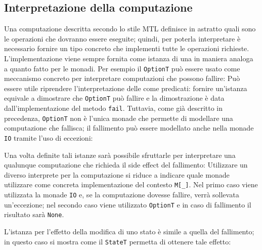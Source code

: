 \subsection{Interpretazione della computazione}
Una computazione descritta secondo lo stile \ac{MTL} definisce in astratto quali sono le operazioni che dovranno essere eseguite; quindi, per poterla interpretare è necessario fornire un tipo concreto che implementi tutte le operazioni richieste.
L'implementazione viene sempre fornita come istanza di una  in maniera analoga a quanto fatto per le monadi.
Per esempio il  \lstinline{OptionT} può essere usato come meccanismo concreto per interpretare computazioni che possono fallire:
Può essere utile riprendere l'interpretazione delle  come predicati: fornire un'istanza equivale a dimostrare che \lstinline{OptionT} può fallire e la dimostrazione è data dall'implementazione del metodo \lstinline{fail}. Tuttavia, come già descritto in precedenza, \lstinline{OptionT} non è l'unica monade che permette di modellare una computazione che fallisca; il fallimento può essere modellato anche nella monade \lstinline{IO} tramite l'uso di eccezioni:

Una volta definite tali istanze sarà possibile sfruttarle per interpretare una qualunque computazione che richieda il side effect del fallimento:
Utilizzare un diverso interprete per la computazione si riduce a indicare quale monade utilizzare come concreta implementazione del contesto \lstinline{M[_]}. Nel primo caso viene utilizzata la monade \lstinline{IO} e, se la computazione dovesse fallire, verrà sollevata un'eccezione; nel secondo caso viene utilizzato \lstinline{OptionT} e in caso di fallimento il risultato sarà \lstinline{None}.

L'istanza per l'effetto della modifica di uno stato è simile a quella del fallimento; in questo caso si mostra come il  \lstinline{StateT} permetta di ottenere tale effetto:

